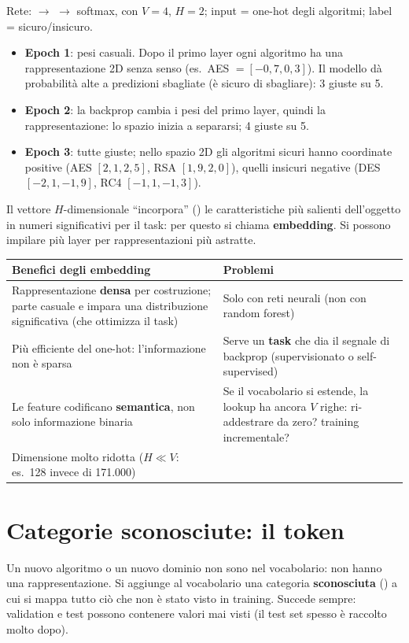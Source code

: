 \begin{esempio}
Rete:  $\to$  $\to$ softmax, con $V=4$, $H=2$; input = one-hot degli algoritmi; label = sicuro/insicuro.
\begin{itemize}
  \item \textbf{Epoch 1}: pesi casuali. Dopo il primo layer ogni algoritmo ha una rappresentazione 2D senza senso (es.\ AES $=[-0{,}7, 0{,}3]$).
        Il modello dà probabilità alte a predizioni sbagliate (è sicuro di sbagliare): 3 giuste su 5.
  \item \textbf{Epoch 2}: la backprop cambia i pesi del primo layer, quindi la rappresentazione: lo spazio inizia a separarsi; 4 giuste su 5.
  \item \textbf{Epoch 3}: tutte giuste; nello spazio 2D gli algoritmi sicuri hanno coordinate positive (AES $[2{,}1, 2{,}5]$, RSA $[1{,}9, 2{,}0]$),
        quelli insicuri negative (DES $[-2{,}1, -1{,}9]$, RC4 $[-1{,}1, -1{,}3]$).
\end{itemize}
Il vettore $H$-dimensionale ``incorpora'' () le caratteristiche più salienti dell'oggetto in numeri significativi per il task:
per questo si chiama \textbf{embedding}. Si possono impilare più layer per rappresentazioni più astratte.
\end{esempio}

\begin{center}
\small
\begin{tabularx}{\textwidth}{X X}
\toprule
\textbf{Benefici degli embedding} & \textbf{Problemi}\\
\midrule
Rappresentazione \textbf{densa} per costruzione; parte casuale e impara una distribuzione significativa (che ottimizza il task) & Solo con reti neurali (non con random forest)\\
Più efficiente del one-hot: l'informazione non è sparsa & Serve un \textbf{task} che dia il segnale di backprop (supervisionato o self-supervised)\\
Le feature codificano \textbf{semantica}, non solo informazione binaria & Se il vocabolario si estende, la lookup ha ancora $V$ righe: ri-addestrare da zero? training incrementale?\\
Dimensione molto ridotta ($H \ll V$: es.\ 128 invece di 171.000) & \\
\bottomrule
\end{tabularx}
\end{center}

\section{Categorie sconosciute: il token }
Un nuovo algoritmo o un nuovo dominio non sono nel vocabolario: non hanno una rappresentazione. Si aggiunge al vocabolario una categoria
\textbf{sconosciuta} () a cui si mappa tutto ciò che non è stato visto in training. Succede sempre: validation e test possono
contenere valori mai visti (il test set spesso è raccolto molto dopo).

